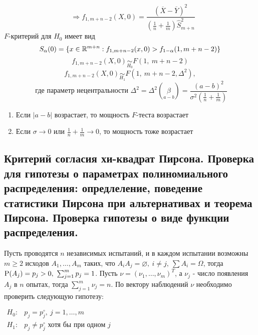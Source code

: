 \begin{example}
\[\begin{array}{l}
\end{array}
\Rightarrow
\boxed{f_{1, m+n-2}(X,0)=\frac{(\overline{X}-\overline{Y})^2}{\left(\frac{1}{n} + \frac{1}{m}\right)\widehat{S}^2_{m+n}}}
\]
$F$-критерий для $H_0$ имеет вид
\[S_{\alpha}(0)=\{x\in\mathbb{R}^{m+n}:f_{1,m+n-2}(x,0)>f_{1-\alpha}(1,m+n-2)\}\]
\[f_{1,m+n-2}(X,0)\underset{H_0}{\sim}F(1,\ m+n-2)\]
\[f_{1,m+n-2}(X,0)\underset{H_1}{\sim}F(1,\ m+n-2,\Delta^2),\]
\[\text{ где параметр нецентральности } \Delta^2=\Delta^2(\underset{a-b}{\beta})=\frac{(a-b)^2}{\sigma^2\left(\frac{1}{n}+\frac{1}{m}\right)}\]
\begin{enumerate}
    \item Если $\vert a-b\vert$  возрастает, то мощность $F$-теста возрастает
    \item Если $\sigma\rightarrow0$ или $\frac{1}{n}+\frac{1}{m}\rightarrow0$, то мощность тоже возрастает
\end{enumerate}
\end{example}

\subsection{Критерий согласия хи-квадрат Пирсона. Проверка для гипотезы о параметрах полиномиального распределения:
опредлеление, поведение статистики Пирсона при альтернативах и теорема Пирсона. Проверка гипотезы о виде функции распределения.}
Пусть проводятся $n$ независимых испытаний, и в каждом испытании возможны
$m\geq2$ исходов $A_1,\ldots,A_m$ таких, что $A_iA_j=\varnothing,\ i\neq j,\ \sum A_i=\Omega$, тогда
$\P(A_j)=p_j>0,\ \sum_{j=1}^mp_j=1$. Пусть $\nu=(\nu_1,\ldots,\nu_m)^T$, а $\nu_j$ -
число появления $A_j$ в $n$ опытах, тогда $\sum_{j=1}^m\nu_j=n$.
По вектору наблюдений $\nu$ необходимо проверить следующую гипотезу:

$\begin{array}{cl}
    H_0:& p_j=p_j^\circ,\ j=1,\ldots,m\\
    H_1:& p_j\neq p_j^\circ\text{ хотя бы при одном $j$}
\end{array}$

